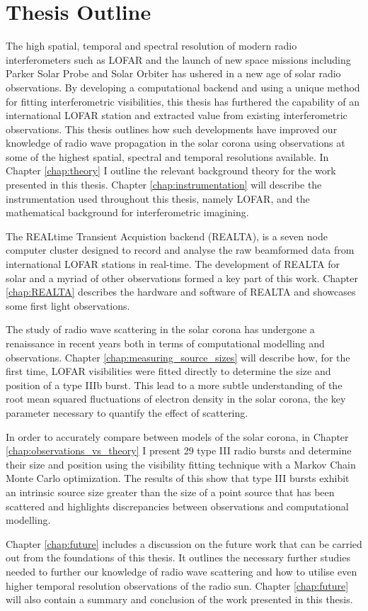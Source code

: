 \section{Thesis Outline}
The high spatial, temporal and spectral resolution of modern radio interferometers such as LOFAR and the launch of new space missions including Parker Solar Probe \citep[PSP;][]{Fox2016} and Solar Orbiter \citep{Muller2020} has ushered in a new age of solar radio observations. By developing a computational backend and using a unique method for fitting interferometric visibilities, this thesis has furthered the capability of an international LOFAR station and extracted value from existing interferometric observations. This thesis outlines how such developments have improved our knowledge of radio wave propagation in the solar corona using observations at some of the highest spatial, spectral and temporal resolutions available. In Chapter \ref{chap:theory} I outline the relevant background theory for the work presented in this thesis. Chapter \ref{chap:instrumentation} will describe the instrumentation used throughout this thesis, namely LOFAR, and the mathematical background for interferometric imagining. 

The REALtime Transient Acquistion backend (REALTA), is a seven node computer cluster designed to record and analyse the raw beamformed data from international LOFAR stations in real-time. The development of REALTA for solar and a myriad of other observations formed a key part of this work. Chapter \ref{chap:REALTA} describes the hardware and software of REALTA and showcases some first light observations.
 
The study of radio wave scattering in the solar corona has undergone a renaissance in recent years both in terms of computational modelling and observations. Chapter \ref{chap:measuring_source_sizes} will describe how, for the first time, LOFAR visibilities were fitted directly to determine the size and position of a type IIIb burst. This lead to a more subtle understanding of the root mean squared fluctuations of electron density in the solar corona, the key parameter necessary to quantify the effect of scattering. 

In order to accurately compare between models of the solar corona, in Chapter \ref{chap:observations_vs_theory} I present 29 type III radio bursts and determine their size and position using the visibility fitting technique with a Markov Chain Monte Carlo optimization. The results of this show that type III bursts exhibit an intrinsic source size greater than the size of a point source that has been scattered and highlights discrepancies between observations and computational modelling.

Chapter \ref{chap:future} includes a discussion on the future work that can be carried out from the foundations of this thesis. It outlines the necessary further studies needed to further our knowledge of radio wave scattering and how to utilise even higher temporal resolution observations of the radio sun. Chapter \ref{chap:future} will also contain a summary and conclusion of the work presented in this thesis.

